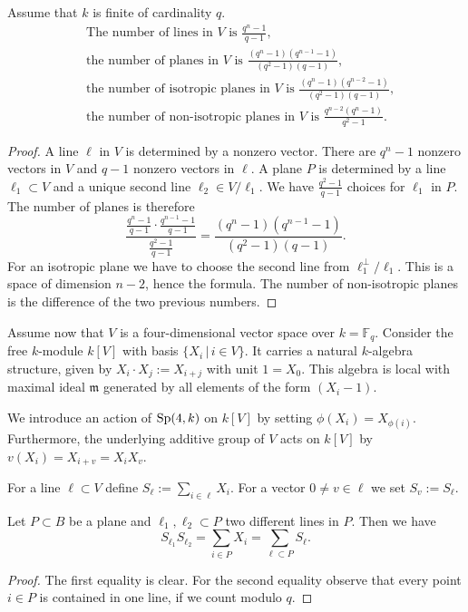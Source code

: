 \begin{proposition}\label{OrbitesSp}
Assume that $k$ is finite of cardinality $q$.
\begin{align}
&\text{The number of lines in $V$ is }\frac{q^n-1}{q-1}, \\
&\text{the number of planes in $V$ is }\frac{(q^n-1)(q^{n-1}-1)}{(q^2-1)(q-1)}, \\
&\text{the number of isotropic planes in $V$ is }\frac{(q^n-1)(q^{n-2}-1)}{(q^2-1)(q-1)}, \\
&\text{the number of non-isotropic planes in $V$ is }\frac{q^{n-2}(q^n-1)}{q^2-1}.
\end{align}
\end{proposition}
\begin{proof}
A line $\ell$ in $V$ is determined by a nonzero vector. There are $q^n - 1$ nonzero vectors in $V$ and $q-1$ nonzero vectors in $\ell$. A plane $P$ is determined by a line $\ell_1 \subset V$ and a unique second line $\ell_2\in V/\ell_1$. We have $\frac{q^2-1}{q-1}$ choices for $\ell_1$ in $P$. The number of planes is therefore
$$
\frac{ \frac{q^n-1}{q-1} \cdot\frac{q^{n-1}-1}{q-1}}{\frac{q^2-1}{q-1} } = \frac{(q^n-1)(q^{n-1}-1)}{(q^2-1)(q-1)}.
$$
For an isotropic plane we have to choose the second line from $\ell_1^\perp/\ell_1$. This is a space of dimension $n-2$, hence the formula. The number of non-isotropic planes is the difference of the two previous numbers.
\end{proof}

Assume now that $V$ is a four-dimensional vector space over $k=\mathbb F_q$. Consider the free $k$-module $k[V]$ with basis $\{X_i \,|\, i\in V\}$. It carries a natural $k$-algebra structure, given by
$X_i\cdot X_j := X_{i+j}$ with unit $1=X_0$. This algebra is local with maximal ideal $\mathfrak m$ generated by all elements of the form $(X_i-1)$.

We introduce an action of $\operatorname{Sp} (4,k)$ on $k[V]$ by setting $\phi(X_i) = X_{\phi(i)}$. Furthermore, the underlying additive group of $V$ acts on $k[V]$ by $v( X_i) = X_{i+v} =X_iX_v$. 
\begin{definition}
For a line $\ell\subset V$ define $S_\ell := \sum_{i\in\ell} X_i$. For a vector $0\neq v\in \ell$ we set $S_v:=S_\ell$.
\end{definition}
\begin{lemma}\label{SympLemma}
Let $P\subset B$ be a plane and $\ell_1,\ell_2\subset P$ two different lines in $P$. Then we have
$$
S_{\ell_1}S_{\ell_2}=\sum_{i\in P}X_i = \sum_{\ell\subset P}S_\ell.
$$
\end{lemma}
\begin{proof}
The first equality is clear. For the second equality observe that every point $i\in P$ is contained in one line, if we count modulo $q$.
\end{proof}

